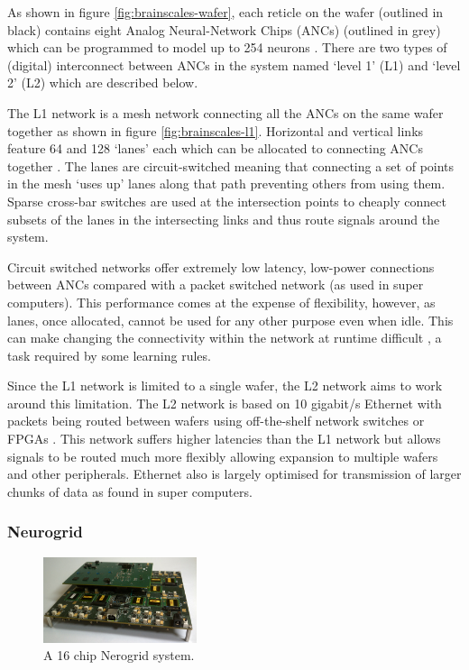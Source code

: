 				As shown in figure \ref{fig:brainscales-wafer}, each reticle on the
				wafer (outlined in black) contains eight Analog Neural-Network Chips
				(ANCs) (outlined in grey) which can be programmed to model up to 254
				neurons \cite{schemmel10}. There are two types of (digital) interconnect
				between ANCs in the system named `level 1' (L1) and `level 2' (L2) which
				are described below.
			
				The L1 network is a mesh network connecting all the ANCs on the same
				wafer together as shown in figure \ref{fig:brainscales-l1}. Horizontal
				and vertical links feature 64 and 128 `lanes' each which can be
				allocated to connecting ANCs together \cite{fieres08}. The lanes are
				circuit-switched meaning that connecting a set of points in the mesh
				`uses up' lanes along that path preventing others from using them.
				Sparse cross-bar switches are used at the intersection points to cheaply
				connect subsets of the lanes in the intersecting links and thus route
				signals around the system.
				
				Circuit switched networks offer extremely low latency, low-power
				connections between ANCs compared with a packet switched network (as
				used in super computers). This performance comes at the expense of
				flexibility, however, as lanes, once allocated, cannot be used for any
				other purpose even when idle. This can make changing the connectivity
				within the network at runtime difficult \cite{dally04}, a task required
				by some learning rules.
				
				Since the L1 network is limited to a single wafer, the L2 network aims
				to work around this limitation. The L2 network is based on 10 gigabit/s
				Ethernet with packets being routed between wafers using off-the-shelf
				network switches or FPGAs \cite{schemmel10}. This network suffers higher
				latencies than the L1 network but allows signals to be routed much more
				flexibly allowing expansion to multiple wafers and other peripherals.
				Ethernet also is largely optimised for transmission of larger chunks of
				data as found in super computers.
			
			\subsubsection{Neurogrid}
				
				\begin{figure}
					\center
					\includegraphics[width=0.4\textwidth]{figures/neurogrid}
					
					\caption{A 16 chip Nerogrid system.}
					\label{fig:neurogrid}
				\end{figure}
				
